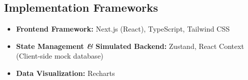 \subsection{Implementation Frameworks}
\begin{itemize}
    \item \textbf{Frontend Framework:} Next.js (React), TypeScript, Tailwind CSS
    \item \textbf{State Management \textsl{\&} Simulated Backend:} Zustand, React Context (Client-side mock database)
    \item \textbf{Data Visualization:} Recharts
\end{itemize}
